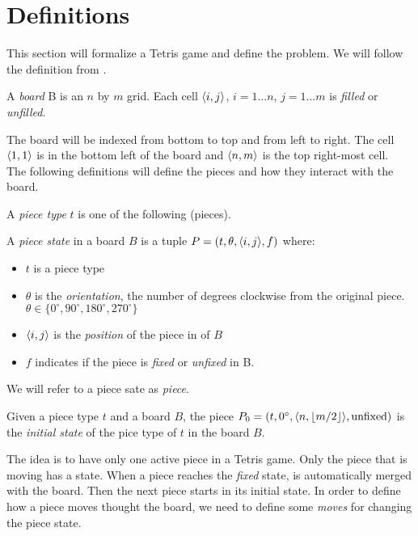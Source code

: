 \section{Definitions}

This section will formalize a Tetris game and define the problem. We will follow the definition from \cite{TIH}.


\begin{definition}
  A \emph{board} B is an $n$ by $m$ grid. Each cell $\cell$, $i = 1\dots n$, $j = 1\dots m$ is \emph{filled} or \emph{unfilled}.
\end{definition}

The board will be indexed from bottom to top and from left to right. The cell $\cell[1][1]$ is in the bottom left of the board and $\cell[n][m]$ is the top right-most cell. \\

The following definitions will define the pieces and how they interact with the board.

\begin{definition}
  A \emph{piece type} $t$ is one of the following (pieces). 
\end{definition}

\begin{definition}
 A \emph{piece state} in a board $B$ is a tuple $ P = \piece$ where:
  \begin{itemize}
    \item $t$ is a piece type
    \item $\theta$ is the \emph{orientation}, the number of degrees clockwise from the original piece. $ \theta \in \lbrace 0^\circ, 90^\circ, 180^\circ, 270^\circ \rbrace$
    \item $\cell$ is the \emph{position} of the piece in of $B$
    \item  $f$ indicates if the piece is \emph{fixed} or \emph{unfixed} in B.
  \end{itemize}

  We will refer to a piece sate as \emph{piece}.
   
\end{definition}

\begin{definition}
  Given a piece type $t$ and a board $B$, the piece $P_0 = \piece[t][0^\circ][n][\lfloor m / 2 \rfloor][\text{unfixed}]$ is the \emph{initial state} of the pice type of $t$ in the board $B$.
\end{definition}


The idea is to have only one active piece in a Tetris game. Only the piece that is moving has a state. When a piece reaches the \emph{fixed} state, is automatically merged with the board. Then the next piece starts in its initial state. In order to define how a piece moves thought the board, we need to define some \emph{moves} for changing the piece state.

